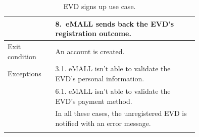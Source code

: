 \begin{center}
\begin{longtable}{lp{0.75\linewidth}}
        & 8.\ eMALL sends back the EVD’s registration outcome.                                                                                                                                                   \\
        \hline
        Exit condition   & An account is created.                                                                                                                                                                                 \\
        \hline
        Exceptions       & 3.1. eMALL isn’t able to validate the EVD’s personal information.                                                                                                                                      \\
        & 6.1. eMALL isn’t able to validate the EVD’s payment method.                                                                                                                                            \\
        & In all these cases, the unregistered EVD is notified with an error message.                                                                                                                            \\
        \hline
        \caption{EVD signs up use case.}
        \label{tab: EVD_sign_up_use_case}
    \end{longtable}

\end{center}

